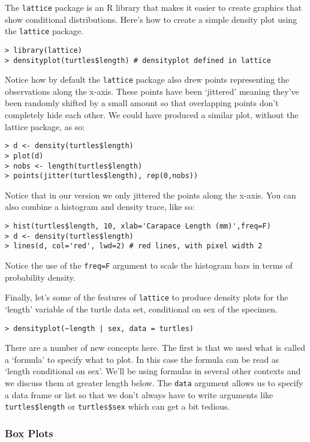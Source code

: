 The \lstinline!lattice! package is an R library that makes it easier to
create graphics that show conditional distributions. Here's how to
create a simple density plot using the \lstinline!lattice! package.

\begin{lstlisting}
> library(lattice)
> densityplot(turtles$length) # densityplot defined in lattice
\end{lstlisting}
Notice how by default the \lstinline!lattice! package also drew points
representing the observations along the x-axis. These points have been
`jittered' meaning they've been randomly shifted by a small amount so
that overlapping points don't completely hide each other. We could have
produced a similar plot, without the lattice package, as so:

\begin{lstlisting}
> d <- density(turtles$length)
> plot(d)
> nobs <- length(turtles$length)
> points(jitter(turtles$length), rep(0,nobs)) 
\end{lstlisting}
Notice that in our version we only jittered the points along the x-axis.
You can also combine a histogram and density trace, like so:

\begin{lstlisting}
> hist(turtles$length, 10, xlab='Carapace Length (mm)',freq=F)
> d <- density(turtles$length)
> lines(d, col='red', lwd=2) # red lines, with pixel width 2    
\end{lstlisting}
Notice the use of the \lstinline!freq=F! argument to scale the histogram
bars in terms of probability density.

Finally, let's some of the features of \lstinline!lattice! to produce
density plots for the `length' variable of the turtle data set,
conditional on sex of the specimen.

\begin{lstlisting}
> densityplot(~length | sex, data = turtles)    
\end{lstlisting}
There are a number of new concepts here. The first is that we used what
is called a `formula' to specify what to plot. In this case the formula
can be read as `length conditional on sex'. We'll be using formulas in
several other contexts and we discuss them at greater length below. The
\lstinline!data! argument allows us to specify a data frame or list so
that we don't always have to write arguments like
\lstinline!turtles$length! or \lstinline!turtles$sex! which can get a
bit tedious.

\subsubsection{Box Plots}

